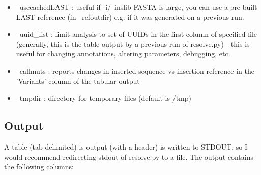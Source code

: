 \documentclass[letterpaper,11pt]{article}
\begin{document}
\begin{itemize}
\item --usecachedLAST : useful if -i/--inslib FASTA is large, you can use a pre-built LAST reference (in --refoutdir) e.g. if it was generated on a previous run.
\item --uuid\_list : limit analysis to set of UUIDs in the first column of specified file (generally, this is the table output by a previous run of resolve.py) - this is useful for changing annotations, altering parameters, debugging, etc.
\item --callmuts : reports changes in inserted sequence vs insertion reference in the 'Variants' column of the tabular output
\item --tmpdir : directory for temporary files (default is /tmp)
\end{itemize}

\subsection{Output}
A table (tab-delimited) is output (with a header) is written to STDOUT, so I would recommend redirecting stdout of resolve.py to a file. The output contains the following columns:
\end{document}
